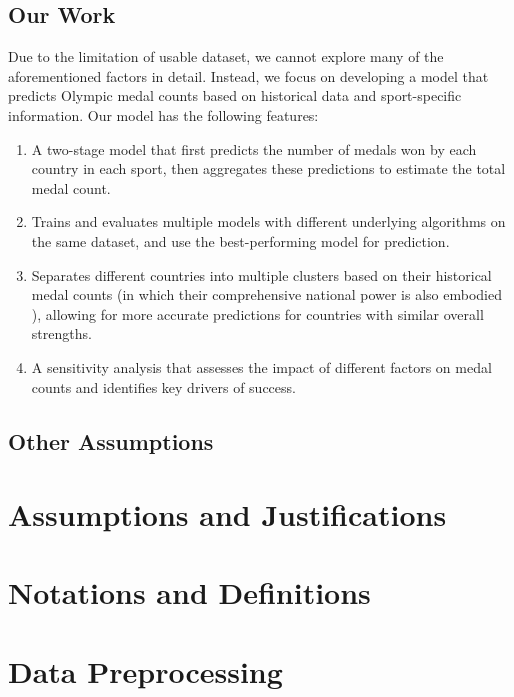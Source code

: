 \documentclass{mcmthesis}
\begin{document}
\subsection{Our Work}

Due to the limitation of usable dataset, we cannot explore many of the aforementioned factors in detail. Instead, we focus on developing a model that predicts Olympic medal counts based on historical data and sport-specific information. Our model has the following features:

\begin{enumerate}
    \item A two-stage model that first predicts the number of medals won by each country in each sport, then aggregates these predictions to estimate the total medal count.
    \item Trains and evaluates multiple models with different underlying algorithms on the same dataset, and use the best-performing model for prediction.
    \item Separates different countries into multiple clusters based on their historical medal counts (in which their comprehensive national power is also embodied \cite{7}), allowing for more accurate predictions for countries with similar overall strengths.
    \item A sensitivity analysis that assesses the impact of different factors on medal counts and identifies key drivers of success. 
\end{enumerate}

\subsection{Other Assumptions}


\section{Assumptions and Justifications}

\section{Notations and Definitions}


\section{Data Preprocessing}
\end{document}
